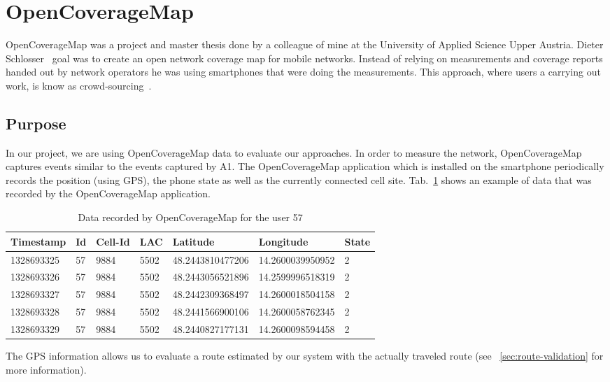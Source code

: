 \documentclass[master,english]{hgbthesis}
\begin{document}
\section{OpenCoverageMap}
OpenCoverageMap was a project and  master thesis done by a colleague of mine at the University of Applied Science Upper Austria. Dieter Schlosser~\cite{Schlosser2012} goal was to create an open network coverage map for mobile networks. Instead of relying on measurements and coverage reports handed out by network operators he was using smartphones that were doing the measurements. This approach, where users a carrying out work, is know as crowd-sourcing~\cite{Surowiecki2004}.
\subsection{Purpose}
In our project, we are using OpenCoverageMap data to evaluate our approaches. In order to measure the network, OpenCoverageMap captures events similar to the events captured by A1.
The OpenCoverageMap application which is installed on the smartphone periodically records the position (using GPS), the phone state as well as the currently connected cell site. Tab.\ \ref{tab:ocmrecord} shows an example of data that was recorded by the OpenCoverageMap application.
\begin{table}
	\begin{tabular}{|l|l|l|l|l|l|l|}  \hline
		\textbf{Timestamp} & \textbf{Id} & \textbf{Cell-Id} & \textbf{LAC} & \textbf{Latitude} & \textbf{Longitude} & \textbf{State} \\    \hline 1328693325 & 57         & 9884   & 5502 & 48.2443810477206 & 14.2600039950952 & 2 \\  \hline
		1328693326 & 57         & 9884   & 5502 & 48.2443056521896 & 14.2599996518319 & 2\\  \hline
		1328693327 & 57         & 9884   & 5502 & 48.2442309368497 & 14.2600018504158 & 2\\  \hline
		1328693328 & 57         & 9884   & 5502 & 48.2441566900106 & 14.2600058762345 & 2\\  \hline
		1328693329 & 57         & 9884   & 5502 & 48.2440827177131 & 14.2600098594458 & 2\\  \hline
	\end{tabular}
	\caption{Data recorded by OpenCoverageMap for the user 57}
	\label{tab:ocmrecord}
\end{table}
The GPS information allows us to evaluate a route estimated by our system with the actually traveled route (see ~\ref{sec:route-validation} for more information).
\end{document}
